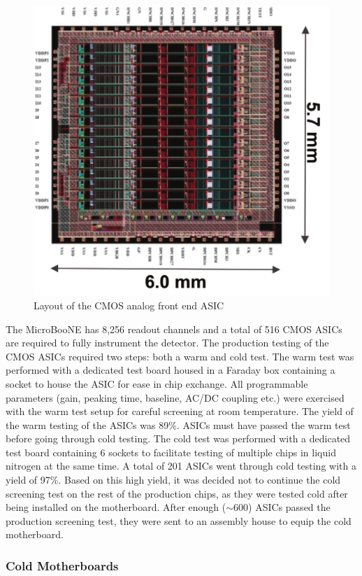 \begin{figure}
\centering
\includegraphics[width=0.75\linewidth]{figures/asic.pdf}
\caption{\label{fig:figasic}Layout of the CMOS analog front end ASIC}
\end{figure}


The MicroBooNE \lartpc has  8,256 readout channels and a total of 516 CMOS ASICs are required to fully instrument the detector. The production testing of the CMOS ASICs required two steps: both a warm and cold test. The warm test was performed with a dedicated test board housed in a Faraday box containing a socket to house the ASIC for ease in chip exchange. All programmable parameters (gain, peaking time, baseline, AC/DC coupling etc.) were exercised with the warm test setup for careful screening at room temperature. The yield of the warm testing of the ASICs was 89\%. ASICs must have passed the warm test before going through cold testing. The cold test was performed with a dedicated test board containing 6 sockets to facilitate testing of multiple chips in liquid nitrogen at the same time. A total of 201 ASICs went through cold testing with a yield of 97\%. Based on this high yield, it was decided not to continue the cold screening test on the rest of the production chips, as they were tested cold after being installed on the motherboard. After enough ($\sim$600) ASICs passed the production screening test, they were sent to an assembly house to equip the cold motherboard.



\subsubsection{Cold Motherboards}


